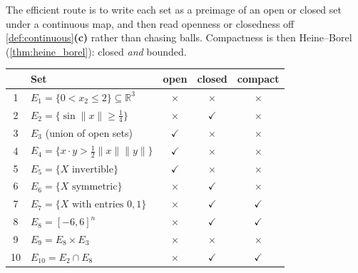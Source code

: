 \begin{exercisesolution}
The efficient route is to write each set as a preimage of an open or closed set under a
continuous map, and then read openness or closedness off \cref{def:continuous}\textbf{(c)}
rather than chasing balls. Compactness is then Heine--Borel (\cref{thm:heine_borel}): closed
\emph{and} bounded.
\begin{center}
\begin{tabular}{@{}c l c c c@{}}
& \textbf{Set} & \textbf{open} & \textbf{closed} & \textbf{compact} \\
\hline
1 & $E_1 = \{0 < x_2 \leq 2\} \subseteq \mathbb{R}^3$ & $\times$ & $\times$ & $\times$ \\
2 & $E_2 = \{\sin\lVert x\rVert \geq \tfrac14\}$ & $\times$ & $\checkmark$ & $\times$ \\
3 & $E_3$ (union of open sets) & $\checkmark$ & $\times$ & $\times$ \\
4 & $E_4 = \{x\cdot y > \tfrac12\lVert x\rVert\lVert y\rVert\}$ & $\checkmark$ & $\times$ & $\times$ \\
5 & $E_5 = \{X \text{ invertible}\}$ & $\checkmark$ & $\times$ & $\times$ \\
6 & $E_6 = \{X \text{ symmetric}\}$ & $\times$ & $\checkmark$ & $\times$ \\
7 & $E_7 = \{X \text{ with entries } 0,1\}$ & $\times$ & $\checkmark$ & $\checkmark$ \\
8 & $E_8 = [-6,6]^n$ & $\times$ & $\checkmark$ & $\checkmark$ \\
9 & $E_9 = E_8 \times E_3$ & $\times$ & $\times$ & $\times$ \\
10 & $E_{10} = E_2 \cap E_8$ & $\times$ & $\checkmark$ & $\checkmark$ \\
\end{tabular}
\end{center}


\end{exercisesolution}

